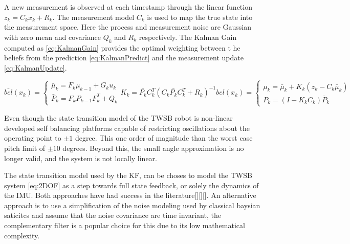         A new measurement is observed at each timestamp through the linear function $z_k = C_k x_k + R_k$. 
        The measurement model $C_k$ is used to map the true state into the measurement space.
        Here the process and measurement noise are Gaussian with zero mean and covariance $Q_k$ and $R_k$ respectively. 
        The Kalman Gain computed as \ref{eq:KalmanGain} provides the optimal weighting between t
        he beliefs from the prediction \ref{eq:KalmanPredict} and the measurement update \ref{eq:KalmanUpdate}.
        
        \begin{subequations}
            \begin{equation}
                \bar{bel}(x_k) = \begin{cases}
                        \bar{\mu}_k = F_k \mu_{k-1} + G_k u_k \\
                        \bar{P}_k = F_k P_{k-1} F_k^T + Q_k
                        \end{cases}
                \label{eq:KalmanPredict}
            \end{equation}
            \begin{equation}
                K_k = \bar{P_k} C_k^T \left(C_k \bar{P_k} C_k^T + R_k \right)^{-1}
                \label{eq:KalmanGain}
            \end{equation}
            \begin{equation}
            bel(x_k) = \begin{cases}
                \mu_k = \bar{\mu}_k + K_k \left(z_k - C_k \bar{\mu}_k \right) \\
                P_k = \left(I - K_k C_k \right) \bar{P}_k
            \end{cases}
            \label{eq:KalmanUpdate}
            \end{equation}
            \label{eq:KalmanAlgorithm}
        \end{subequations}
     
        Even though the state transition model of the TWSB robot is non-linear
        \cite{ooi2003balancing} 
        developed self balancing platforms capable of restricting oscillations about the 
        operating point to $±1$ degree. This one order of magnitude than the worst case pitch limit of $±10$ degrees.
        Beyond this, the small angle approximation is no longer valid, and the system is not locally linear. 

        The state transition model used by the KF, can be choses to model the TWSB system \ref{eq:2DOF} as a step towards 
        full state feedback, or solely the dynamics of the IMU.  Both approaches have had success in the literature[][][]. 
        An alternative approach is to use a simplification of the noise modeling used by classical baysian saticitcs and 
        assume that the noise covariance are time invariant, the complementary filter \cite{ComplimentaryKalman} 
        is a popular choice for this due to its low mathematical complexity. 
     
